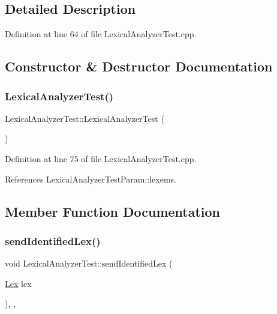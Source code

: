 \subsection{Detailed Description}


Definition at line 64 of file Lexical\+Analyzer\+Test.\+cpp.



\subsection{Constructor \& Destructor Documentation}
\mbox{\label{struct_lexical_analyzer_test_a2d6000048baf250c1b0d6215f9760a92}} 
\subsubsection{\texorpdfstring{Lexical\+Analyzer\+Test()}{LexicalAnalyzerTest()}}
{\footnotesize\ttfamily Lexical\+Analyzer\+Test\+::\+Lexical\+Analyzer\+Test (\begin{DoxyParamCaption}{ }\end{DoxyParamCaption})\hspace{0.3cm}{\ttfamily [inline]}}



Definition at line 75 of file Lexical\+Analyzer\+Test.\+cpp.



References Lexical\+Analyzer\+Test\+Param\+::lexems.



\subsection{Member Function Documentation}
\mbox{\label{struct_lexical_analyzer_test_a1c412feae956dcdc6ca0519e361e8f64}} 
\subsubsection{\texorpdfstring{send\+Identified\+Lex()}{sendIdentifiedLex()}}
{\footnotesize\ttfamily void Lexical\+Analyzer\+Test\+::send\+Identified\+Lex (\begin{DoxyParamCaption}\item[{\hyperlink{classteam22_1_1_calc_1_1_lex}{Lex}}]{lex }\end{DoxyParamCaption})\hspace{0.3cm}{\ttfamily [inline]}, {\ttfamily [override]}, {\ttfamily [virtual]}}



